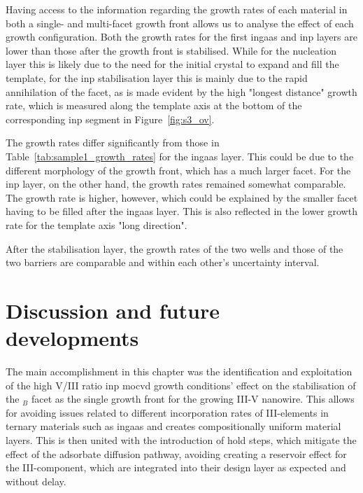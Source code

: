 Having access to the information regarding the growth rates of each material in both a single- and multi-facet growth front allows us to analyse the effect of each growth configuration. Both the  growth rates for the first \acs{ingaas} and \acs{inp} layers are lower than those after the growth front is stabilised. While for the nucleation layer this is likely due to the need for the initial crystal to expand and fill the template, for the \acs{inp} stabilisation layer this is mainly due to the rapid annihilation of the  facet, as is made evident by the high "longest distance" growth rate, which is measured along the  template axis at the bottom of the corresponding \acs{inp} segment in Figure~\ref{fig:s3_ov}.

The growth rates differ significantly from those in Table~\ref{tab:sample1_growth_rates} for the \acs{ingaas} layer. This could be due to the different morphology of the growth front, which has a much larger  facet. For the \acs{inp} layer, on the other hand, the growth rates remained somewhat comparable. The  growth rate is higher, however, which could be explained by the smaller  facet having to be filled after the \acs{ingaas} layer. This is also reflected in the lower growth rate for the  template axis "long direction".

After the stabilisation layer, the growth rates of the two wells and those of the two barriers are comparable and within each other's uncertainty interval.
\par

\section{Discussion and future developments}

The main accomplishment in this chapter was the identification and exploitation of the high V/III ratio \acs{inp} \acs{mocvd} growth conditions' effect on the stabilisation of the \(_B\) facet as the single growth front for the growing III-V nanowire. This allows for avoiding issues related to different incorporation rates of III-elements in ternary materials such as \acs{ingaas} \cite{Borg2019} and creates compositionally uniform material layers. This is then united with the introduction of hold steps, which mitigate the effect of the adsorbate diffusion pathway, avoiding creating a reservoir effect for the III-component, which are integrated into their design layer as expected and without delay. 


